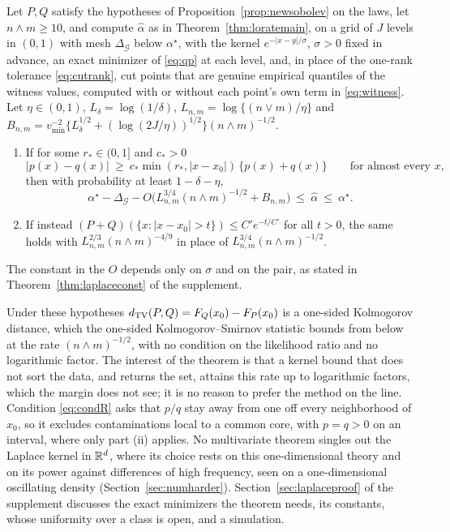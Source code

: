 \begin{theorem}
\label{thm:laplacerate}
Let $P,Q$ satisfy the hypotheses of Proposition~\ref{prop:newsobolev} on the laws, let $n\wedge m\ge10$, and compute
$\widehat\alpha$ as in Theorem~\ref{thm:loratemain}, on a grid of $J$ levels in $(0,1)$ with mesh $\Delta_{\mathcal G}$
below $\alpha^\star$, with the kernel $e^{-|x-y|/\sigma}$, $\sigma>0$ fixed in advance, an exact minimizer of
\eqref{eq:qp} at each level, and, in place of the one-rank tolerance \eqref{eq:cutrank}, cut points that are genuine
empirical quantiles of the witness values, computed with or without each point's own term in \eqref{eq:witness}. Let
$\eta\in(0,1)$, $L_\delta=\log(1/\delta)$, $L_{n,m}=\log\{(n\vee m)/\eta\}$ and
$B_{n,m}=v_{\min}^{-2}\{L_\delta^{1/2}+(\log(2J/\eta))^{1/2}\}(n\wedge m)^{-1/2}$.
\begin{enumerate}[label=(\roman*),leftmargin=*]
\item If for some $r_\ast\in(0,1]$ and $c_\ast>0$
\begin{equation}
|p(x)-q(x)|\ \ge\ c_\ast\min(r_\ast,|x-x_0|)\,\{p(x)+q(x)\}\qquad\text{for almost every }x,
\label{eq:condR}
\end{equation}
then with probability at least $1-\delta-\eta$,
\[
\alpha^\star-\Delta_{\mathcal G}-O\big(L_{n,m}^{3/4}(n\wedge m)^{-1/2}+B_{n,m}\big)\ \le\ \widehat\alpha\
\le\ \alpha^\star .
\]
\item If instead $(P+Q)(\{x:|x-x_0|>t\})\le C'e^{-t/C'}$ for all $t>0$, the same holds with
$L_{n,m}^{2/3}(n\wedge m)^{-4/9}$ in place of $L_{n,m}^{3/4}(n\wedge m)^{-1/2}$.
\end{enumerate}
The constant in the $O$ depends only on $\sigma$ and on the pair, as stated in Theorem~\ref{thm:laplaceconst} of the
supplement.
\end{theorem}

Under these hypotheses $d_{\mathrm{TV}}(P,Q)=F_Q(x_0)-F_P(x_0)$ is a one-sided Kolmogorov distance, which the one-sided
Kolmogorov--Smirnov statistic bounds from below at the rate $(n\wedge m)^{-1/2}$, with no condition on the likelihood
ratio and no logarithmic factor. The interest of the theorem is that a kernel bound that does not sort the
data, and returns the set, attains this rate up to logarithmic factors, which the margin does not see; it is no reason
to prefer the method on the line. Condition \eqref{eq:condR} asks that $p/q$ stay away from one off every neighborhood of $x_0$, so it excludes
contaminations local to a common core, with $p=q>0$ on an interval, where only part (ii) applies. No multivariate theorem
singles out the Laplace kernel in $\mathbb{R}^d$, where its choice rests on this one-dimensional theory and on its power against
differences of high frequency, seen on a one-dimensional oscillating density (Section~\ref{sec:numharder}). Section~\ref{sec:laplaceproof} of the supplement discusses
the exact minimizers the theorem needs, its constants, whose uniformity over a class is open, and a simulation.
